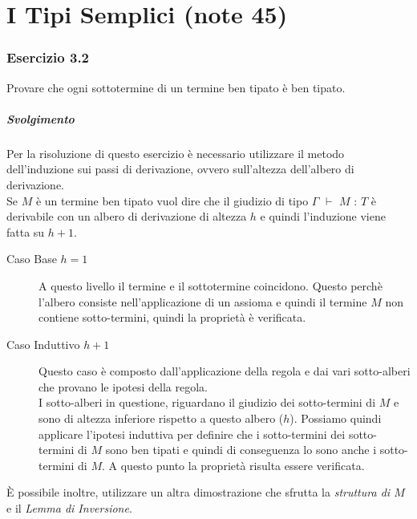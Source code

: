 \section{I Tipi Semplici (note 45)}
 
\subsubsection*{Esercizio 3.2}
Provare che ogni sottotermine di un termine ben tipato \`e ben tipato.
\subparagraph{Svolgimento}
Per la risoluzione di questo esercizio \`e necessario utilizzare il metodo dell'induzione sui passi di derivazione, ovvero sull'altezza dell'albero di derivazione.\\
Se $M$ \`e un termine ben tipato vuol dire che il giudizio di tipo $\Gamma$ $\vdash$ $M$ : $T$ \`e derivabile con un albero di derivazione di altezza $h$ e quindi l'induzione viene fatta su $h+1$.


\begin{description}

 \item[Caso Base $h=1$] A questo livello il termine e il sottotermine coincidono. Questo perch\`e l'albero consiste nell'applicazione di un assioma e quindi il termine $M$ non contiene sotto-termini, quindi la propriet\`a \`e verificata.

 \item[Caso Induttivo $h+1$ ] Questo caso \`e composto dall'applicazione della regola e dai vari sotto-alberi che provano le ipotesi della regola.\\I sotto-alberi in questione, riguardano il giudizio dei sotto-termini di $M$ e sono di altezza inferiore rispetto a questo albero ($h$). Possiamo quindi applicare l'ipotesi induttiva per definire che i sotto-termini dei sotto-termini di $M$ sono ben tipati e quindi di conseguenza lo sono anche i sotto-termini di $M$. A questo punto la propriet\`a risulta essere verificata.
 
 \end{description}
 
 \`E possibile inoltre, utilizzare un altra dimostrazione che sfrutta la \emph{struttura di $M$} e il \emph{Lemma di Inversione}.
 
